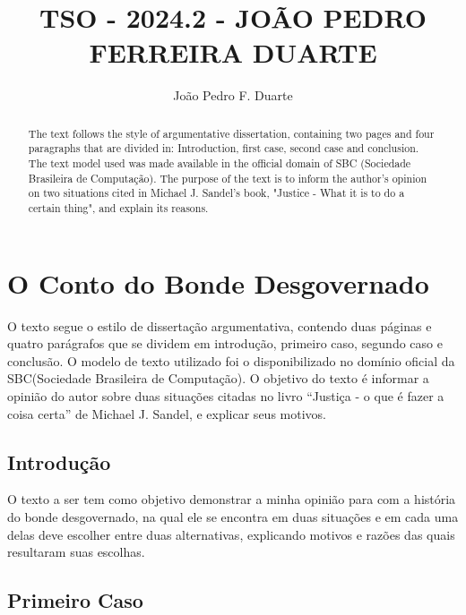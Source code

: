 \documentclass[12pt]{article}
\title{TSO - 2024.2 - JOÃO PEDRO FERREIRA DUARTE}
\author{João Pedro F. Duarte\inst{1} }
\begin{document}
 

\maketitle

\section{O Conto do Bonde Desgovernado} 

\begin{abstract}
  The text follows the style of argumentative dissertation, containing two pages and     four paragraphs that are divided in: Introduction, first case, second case and         conclusion. The text model used was made available in the official domain of SBC       (Sociedade Brasileira de Computação). The purpose of the text is to inform the         author's opinion on two situations cited in Michael J. Sandel's book, "Justice -       What it is to do a certain thing", and explain its reasons.
\end{abstract}
     
\begin{resumo} 
  O texto segue o estilo de dissertação argumentativa, contendo duas páginas e quatro   parágrafos que se dividem em introdução, primeiro caso, segundo caso e                 conclusão. O modelo de texto utilizado foi o disponibilizado no domínio               oficial  da SBC(Sociedade Brasileira de Computação). O objetivo do texto é             informar a  opinião do autor sobre duas situações citadas no livro “Justiça - o que   é fazer a coisa certa” de Michael J. Sandel, e explicar seus motivos.
\end{resumo}


\subsection{Introdução}

O texto a ser tem como objetivo demonstrar a minha opinião para com a história do   bonde desgovernado, na qual ele se encontra em duas situações e em cada uma delas   deve escolher entre duas alternativas, explicando motivos e razões das quais         resultaram suas escolhas.

\subsection{Primeiro Caso} \label{sec:firstpage}
\end{document}
